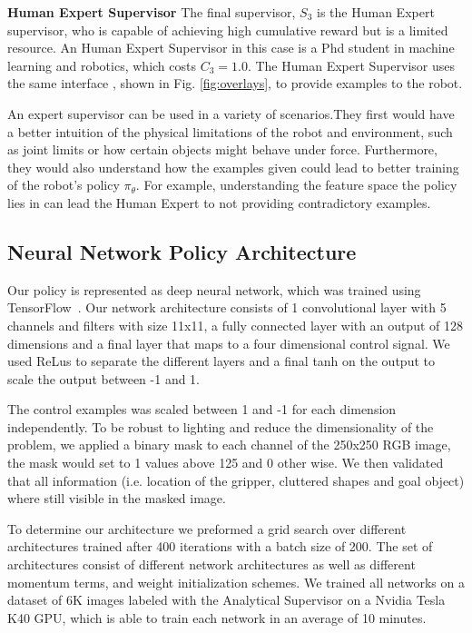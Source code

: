 \documentclass[10pt, conference]{ieeeconf}      %
\begin{document}
\noindent \textbf{Human Expert Supervisor} The final supervisor, $S_3$ is the Human Expert supervisor, who is capable of achieving high cumulative reward but is a limited resource. An Human Expert Supervisor in this case is a Phd student in machine learning and robotics, which costs $C_3=1.0$. The Human Expert Supervisor uses the same interface , shown in Fig. \ref{fig:overlays}, to provide examples to the robot.  

An expert supervisor can be used in a variety of scenarios.They first would have a better intuition of the physical limitations of the robot and environment, such as joint limits or how certain objects might behave under force. Furthermore, they would also understand how the examples given could lead to better training of the robot's policy $\pi_\theta$. For example, understanding the feature space the policy lies in can lead the Human Expert to not providing contradictory examples. 



\subsection{Neural Network Policy Architecture}
Our policy is represented as deep neural network, which was trained using TensorFlow~\cite{tensorflow2015-whitepaper}. Our network architecture consists of 1 convolutional layer with 5 channels and filters with size 11x11, a fully connected layer with an output of 128 dimensions and a final layer that maps to a four dimensional control signal. We used ReLus to separate the different layers and a final tanh on the output to scale the output between -1 and 1. 

The control examples was scaled between 1 and -1 for each dimension independently. To be robust to lighting and reduce the dimensionality of the problem, we applied a binary mask to each channel of the 250x250 RGB image, the mask would set to 1 values above 125 and 0 other wise.  We then validated that all information (i.e. location of the gripper, cluttered shapes and goal object) where still visible in the masked image.



To determine our architecture we preformed a grid search over different architectures  trained after 400 iterations with a batch size of 200. The set of architectures consist of different network architectures as well as different momentum terms, and weight initialization schemes. We trained all networks on a dataset of 6K images labeled with the Analytical Supervisor on a Nvidia Tesla K40 GPU, which is able to train each network in an average of 10 minutes.  
\end{document}
